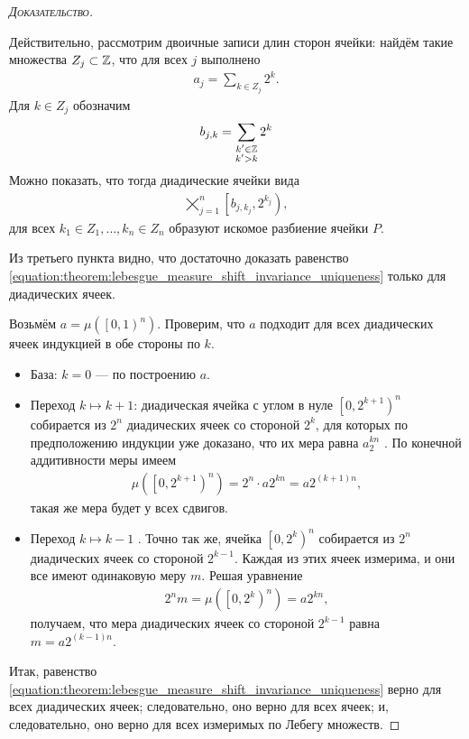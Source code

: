 \begin{proof}[\normalfont\textsc{Доказательство}]
\begin{itemize}
   Действительно, рассмотрим двоичные записи длин сторон ячейки: найдём такие множества $Z_j \subset \mathbb{Z}$, что для всех $j$ выполнено
   \begin{align*}
    a_j = \sum_{k \in Z_j} 2^{k}
   .\end{align*} Для $k \in Z_j$ обозначим  \begin{align*}
   b_{j,k} = \sum_{\substack{k' \in \mathbb{Z} \\ k' > k}} 2^{k}
   \end{align*} Можно показать, что тогда диадические ячейки вида \begin{align*}
   \bigtimes_{j=1}^{n} \left[b_{j, k_j}, 2^{k_j}\right)
   ,\end{align*} для всех $k_1 \in Z_1, \ldots, k_n \in Z_n$ образуют искомое разбиение ячейки $P$.
 \end{itemize}

 Из третьего пункта видно, что достаточно доказать равенство \eqref{equation:theorem:lebesgue_measure_shift_invariance_uniqueness} только для диадических ячеек.

 Возьмём $a = \mu(\left[0, 1\right)^{n})$. Проверим, что $a$ подходит для всех диадических ячеек индукцией в обе стороны по $k$.
 \begin{itemize}
  \item База: $k = 0$ --- по построению $a$.
  \item Переход $k \mapsto k + 1$: диадическая ячейка с углом в нуле $\left[0, 2^{k+1}\right)^{n}$ собирается из $2^{n}$ диадических ячеек со стороной $2^{k}$, для которых по предположению индукции уже доказано, что их мера равна $a_2^{kn}$ . По конечной аддитивности меры имеем
   \begin{align*}
    \mu(\left[0, 2^{k+1}\right)^{n}) = 2^{n} \cdot a2^{kn} = a2^{(k+1)n}
   ,\end{align*} такая же мера будет у всех сдвигов.
  \item Переход $k \mapsto k - 1$ . Точно так же, ячейка $\left[0, 2^{k}\right)^{n}$ собирается из $2^{n}$  диадических ячеек со стороной $2^{k-1}$. Каждая из этих ячеек измерима, и они все имеют одинаковую меру $m$. Решая уравнение
   \begin{align*}
    2^{n}m = \mu(\left[0, 2^{k}\right)^{n}) = a 2^{kn}
   ,\end{align*} получаем, что мера диадических ячеек со стороной $2^{k-1}$ равна $m = a 2^{(k-1)n}$.
 \end{itemize}
 Итак, равенство \eqref{equation:theorem:lebesgue_measure_shift_invariance_uniqueness} верно для всех диадических ячеек; следовательно, оно верно для всех ячеек; и, следовательно, оно верно для всех измеримых по Лебегу множеств.
\end{proof}

